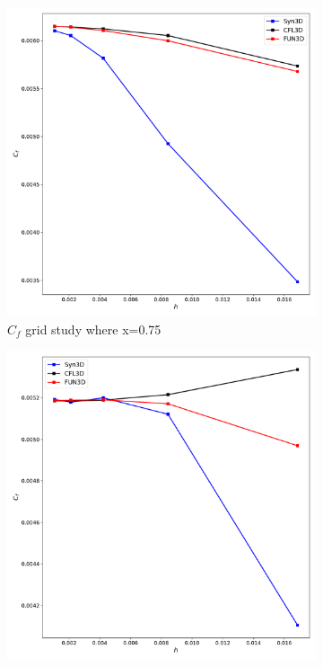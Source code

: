 \begin{figure}[ht!]
\centering
\begin{subfigure}{.45\textwidth}
  \centering
  \includegraphics[width=1.0\textwidth]{figs/2dbump/Cf075GridStudy.pdf}
  \caption{$C_f$ grid study where x=0.75}
\end{subfigure}%
\begin{subfigure}{.45\textwidth}
  \centering
  \includegraphics[width=1.0\textwidth]{figs/2dbump/Cf06321975GridStudy.pdf}

\end{subfigure}
\end{figure}
